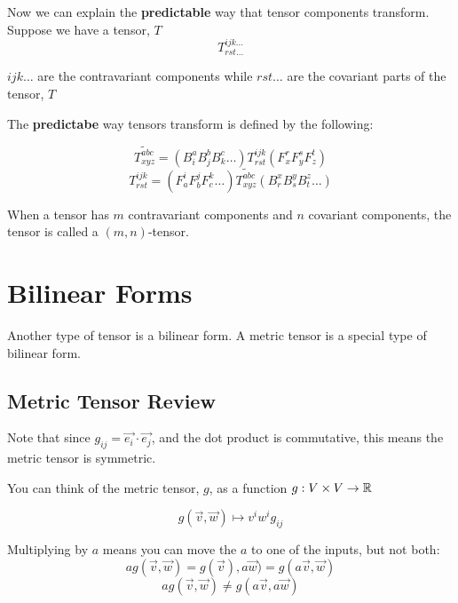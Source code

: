 \documentclass{report}
\begin{document}
Now we can explain the \textbf{predictable} way that tensor components transform. Suppose we have a tensor, $T$
$$ T_{rst\ldots}^{ijk\ldots} $$ 

$ijk\ldots$ are the contravariant components while $rst\ldots$ are the covariant parts of the tensor, $T$

The \textbf{predictabe} way tensors transform is defined by the following:

$$ \widetilde{T_{xyz}^{abc}} = \left( B_i^a B_j^b B_k^c \ldots \right) T_{rst}^{ijk} \left( F_x^r F_y^s F_z^t \right)   $$ 
$$ T_{rst}^{ijk} = \left( F_a^i F_b^j F_c^k \ldots \right) \widetilde{T_{xyz}^{abc}} \left( B_r^x B_s^y B_t^z\ldots \right)   $$ 

When a tensor has $m$ contravariant components and $n$ covariant components, the tensor is called a $(m,n)$-tensor.

\chapter{Bilinear Forms}
Another type of tensor is a bilinear form. A metric tensor is a special type of bilinear form.
\section{Metric Tensor Review}
Note that since $g_{ij} = \vec{e_i} \cdot \vec{e_j}$, and the dot product is commutative, this means the metric tensor is symmetric.

You can think of the metric tensor, $g$, as a function  $g: V \times V \to \R$

$$ g\left( \vec{v}, \vec{w} \right) \mapsto v^iw^i g_{ij} $$ 

Multiplying by $a$ means you can move the $a$ to one of the inputs, but not both:
$$ a g(\vec{v}, \vec{w}) = g\left( \vec{v} \right) , a \vec{w}) = g(a\vec{v}, \vec{w}) $$ 
$$ ag(\vec{v}, \vec{w}) \neq g(a \vec{v}, a \vec{w}) $$ 
\end{document}
